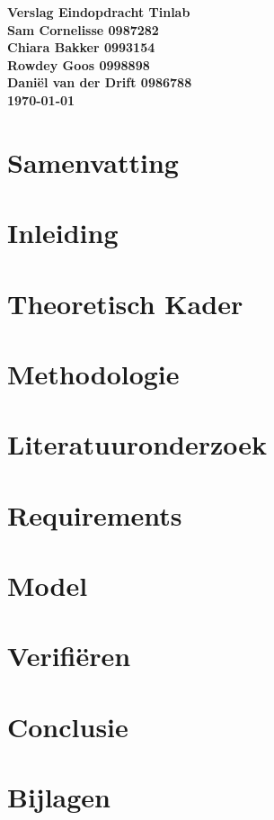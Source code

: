 \documentclass{article}
\begin{document}
\sffamily
\begin{titlepage}
  \centering
    \vfill
    {\bfseries\Huge
      Verslag Eindopdracht Tinlab \\
        \vskip2cm
      }
      {\bfseries\Large
        Sam Cornelisse 0987282\\
	Chiara Bakker 0993154\\
	Rowdey Goos 0998898\\
	Daniël van der Drift 0986788\\
      }
      {
        \bfseries\normalsize
        \vskip1cm
        \today\\
    }
    \vfill
    \vfill
    \vfill
\end{titlepage}
\newpage
\tableofcontents

\newpage
\section{Samenvatting}


\section{Inleiding}


\section{Theoretisch Kader}


\section{Methodologie}


\section{Literatuuronderzoek}


\section{Requirements}


\section{Model}


\section{Verifiëren}


\section{Conclusie}


\newpage
\section{Bijlagen}

\newpage


\end{document}
